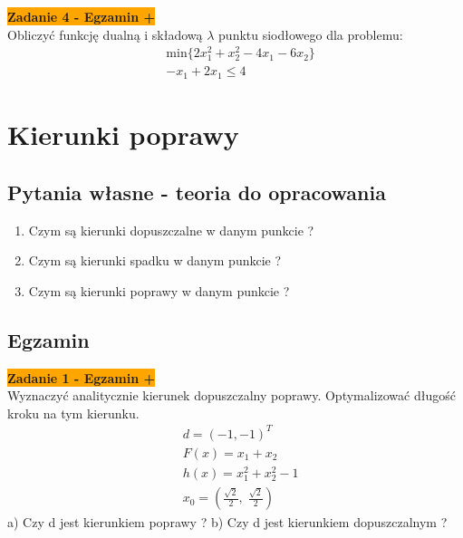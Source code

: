 \documentclass[a4paper,11pt]{article}
\begin{document}
\begin{framed}
\textbf{\colorbox{orange}{Zadanie 4 - Egzamin + }} \\
Obliczyć funkcję dualną i składową \( \lambda \) punktu siodłowego dla problemu:
\begin{align*}
&\text{min} \{ 2x_1^2+x_2^2-4x_1-6x_2 \} \\
&-x_1+2x_1 \leq 4
\end{align*}
\end{framed}





\newpage
\section{Kierunki poprawy}

\subsection{Pytania własne - teoria do opracowania}

\begin{enumerate}

\item Czym są kierunki dopuszczalne w danym punkcie ?
\item Czym są kierunki spadku w danym punkcie ?
\item Czym są kierunki poprawy w danym punkcie ?

\end{enumerate}

\subsection{Egzamin}

\begin{framed}
\textbf{\colorbox{orange}{Zadanie 1 - Egzamin +}} \\
Wyznaczyć analitycznie kierunek dopuszczalny poprawy. Optymalizować długość kroku na tym kierunku. 
\begin{align*}
& d = (-1,-1)^T \\
& F(x)=x_1+x_2 \\
& h(x) = x_1^2+x_2^2-1 \\
& x_0 = ( \frac{\sqrt{2}}{2} ,\; \frac{\sqrt{2}}{2} )
\end{align*}
a) Czy d jest kierunkiem poprawy ?
b) Czy d jest kierunkiem dopuszczalnym ?
\end{framed}
\end{document}
